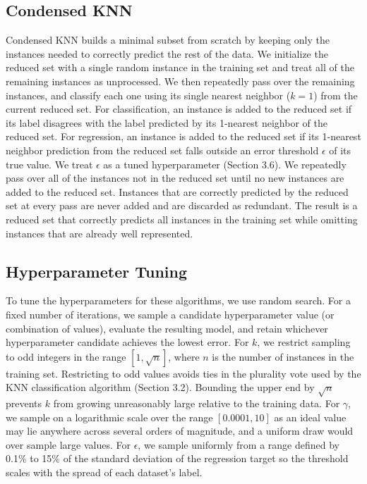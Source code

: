 \documentclass[twoside,11pt]{article}
\begin{document}
\subsection{Condensed KNN}
Condensed KNN builds a minimal subset from scratch by keeping only the instances needed to correctly predict the rest of the data. We initialize the reduced set with a single random instance in the training set and treat all of the remaining instances as unprocessed. We then repeatedly pass over the remaining instances, and classify each one using its single nearest neighbor ($k = 1$) from the current reduced set. For classification, an instance is added to the reduced set if its label disagrees with the label predicted by its 1-nearest neighbor of the reduced set. For regression, an instance is added to the reduced set if its 1-nearest neighbor prediction from the reduced set falls outside an error threshold $\epsilon$ of its true value. We treat $\epsilon$ as a tuned hyperparameter (Section 3.6). We repeatedly pass over all of the instances not in the reduced set until no new instances are added to the reduced set. Instances that are correctly predicted by the reduced set at every pass are never added and are discarded as redundant. The result is a reduced set that correctly predicts all instances in the training set while omitting instances that are already well represented.

\subsection{Hyperparameter Tuning}
To tune the hyperparameters for these algorithms, we use random search. For a fixed number of iterations, we sample a candidate hyperparameter value (or combination of values), evaluate the resulting model, and retain whichever hyperparameter candidate achieves the lowest error. For $k$, we restrict sampling to odd integers in the range $[1,\sqrt{n}]$, where $n$ is the number of instances in the training set. Restricting to odd values avoids ties in the plurality vote used by the KNN classification algorithm (Section 3.2). Bounding the upper end by $\sqrt{n}$ prevents $k$ from growing unreasonably large relative to the training data. For $\gamma$, we sample on a logarithmic scale over the range $[0.0001,10]$ as an ideal value may lie anywhere across several orders of magnitude, and a uniform draw would over sample large values. For $\epsilon$, we sample uniformly from a range defined by 0.1\% to 15\% of the standard deviation of the regression target so the threshold scales with the spread of each dataset's label. 
\end{document}
